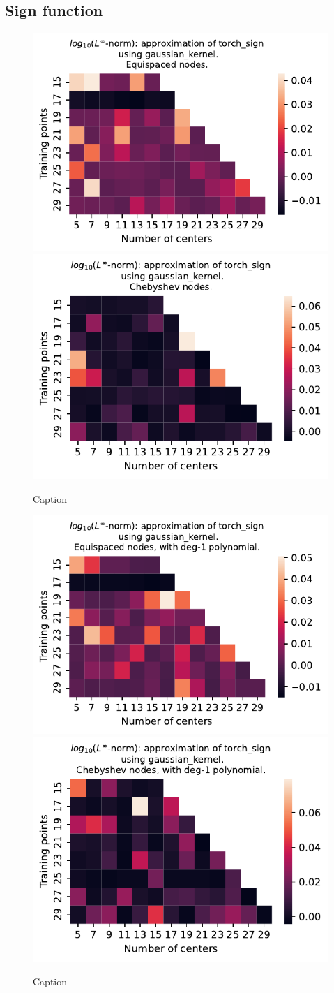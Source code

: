 \documentclass[12pt]{report} %
\begin{document}
\subsection*{Sign function}

\begin{figure}[ht]
    \centering
    
    \includegraphics[width=.49\textwidth]{imagenes/experiments/1d/variational/torch_sign-Kgaussian_kernel-Equi.pdf}
    \includegraphics[width=.49\textwidth]{imagenes/experiments/1d/variational/torch_sign-Kgaussian_kernel-Cheb.pdf}
    \caption{Caption}
    \label{fig:torch-sign-gaussian}
\end{figure}


\begin{figure}[ht]
    \centering
    
    \includegraphics[width=.49\textwidth]{imagenes/experiments/1d/variational/torch_sign-Kgaussian_kernel-Poly-Equi.pdf}
    \includegraphics[width=.49\textwidth]{imagenes/experiments/1d/variational/torch_sign-Kgaussian_kernel-Poly-Cheb.pdf}
    \caption{Caption}
    \label{fig:torch-sign-gaussian-poly}
\end{figure}
\end{document}
